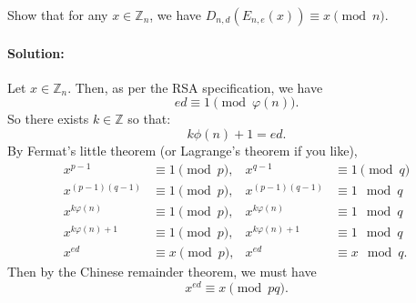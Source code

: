 \documentclass{article}
\begin{document}
\begin{exe}
    Show that for any $x\in \mathbb{Z}_n$, we have $D_{n,d}(E_{n,e}(x)) \equiv  x\pmod{n}$.\end{exe}
\paragraph{Solution: }
Let $x\in \mathbb{Z}_n$. Then, as per the RSA specification, we have
\[
ed\equiv 1\pmod{\varphi(n)} 
.\] 
So there exists $k\in \mathbb{Z}$ so that:
\[
k\phi(n)+1=ed
.\] 
By Fermat's little theorem (or Lagrange's theorem if you like),
\begin{align*}
    x^{p-1}&\equiv 1\pmod{p} ,&
    x^{q-1}&\equiv 1\pmod{q} \\
    x^{(p-1)(q-1)}&\equiv 1\pmod{p} ,&
    x^{(p-1)(q-1)}&\equiv 1\mod{q} \\
    x^{k\varphi(n)}&\equiv 1\pmod{p} ,&
    x^{k\varphi(n)}&\equiv 1\mod{q} \\
    x^{k\varphi(n)+1}&\equiv 1\pmod{p} ,&
    x^{k\varphi(n)+1}&\equiv 1\mod{q} \\
    x^{ed}&\equiv x\pmod{p} ,&
    x^{ed}&\equiv x\mod{q} 
.\end{align*}
Then by the Chinese remainder theorem, we must have
\[
x^{ed}\equiv x\pmod{pq} 
.\] 
\end{document}
